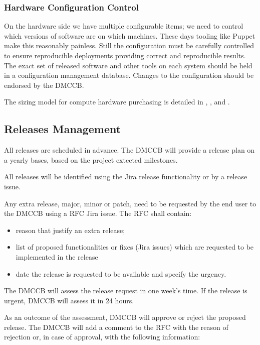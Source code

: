 \subsubsection{Hardware Configuration Control}

On the hardware side we have multiple configurable items; we need to control which versions of software are on which machines. These days tooling like Puppet make this reasonably painless. Still the configuration  must be carefully controlled to ensure reproducible deployments providing correct and reproducible results. The exact set of released software and other tools on each system should be held in a configuration management database.
Changes to the configuration should be endorsed by the DMCCB.

The sizing model for compute hardware purchasing is detailed in , , and .

\subsection {Releases Management } \label{sect:release}


All releases are scheduled in advance.
The DMCCB will provide a release plan on a yearly bases, based on the project extected milestones.

All releases will be identified using the Jira release functionality or by a release issue.

Any extra release, major, minor or patch, need to be requested by the end user to the DMCCB using a RFC Jira issue. The RFC shall contain:

\begin{itemize}
\item reason that justify an extra release;
\item list of proposed functionalities or fixes (Jira issues) which are requested to be implemented in the release
\item date the release is requested to be available and specify the urgency.
\end{itemize}

The DMCCB will assess the release request in one week's time. If the release is urgent, DMCCB will assess it in 24 hours.

As an outcome of the assessment, DMCCB will approve or reject the proposed release.
The DMCCB will add a comment to the RFC with the reason of rejection or, in case of approval, 
with the following information:

